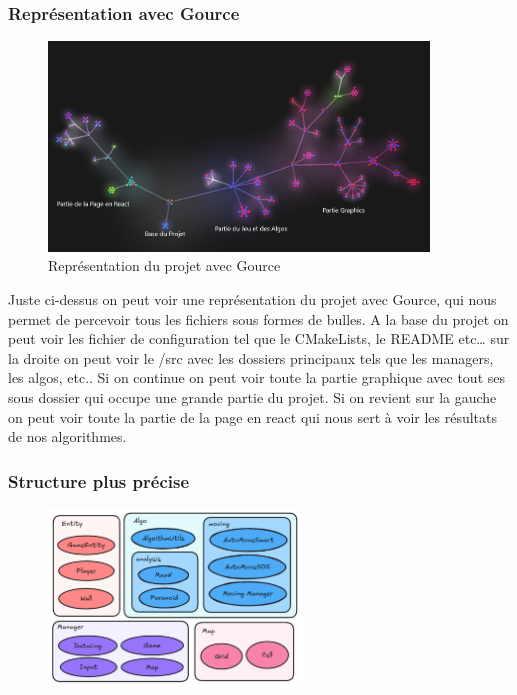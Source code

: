 \subsubsection{Représentation avec Gource}
\begin{figure}[h]
	\centering
	\includegraphics[width=0.9\textwidth]{images/GourceScreen.png}
	\caption{Représentation du projet avec Gource}
	\label{GourceScreen}
\end{figure}
Juste ci-dessus on peut voir une représentation du projet avec Gource, qui nous permet de percevoir tous les fichiers sous formes de bulles. A la base du projet on peut voir les fichier de configuration tel que le CMakeLists, le README etc… sur la droite on peut voir le /src avec les dossiers principaux tels que les managers, les algos, etc.. Si on continue on peut voir toute la partie graphique avec tout ses sous dossier qui occupe une grande partie du projet. Si on revient sur la gauche on peut voir toute la partie de la page en react qui nous sert à voir les résultats de nos algorithmes.

\newpage

\subsubsection{Structure plus précise}
\begin{figure}
	\centering
	\includegraphics[width=0.6\textwidth]{images/ExcalidrawBase.png}
\end{figure}

